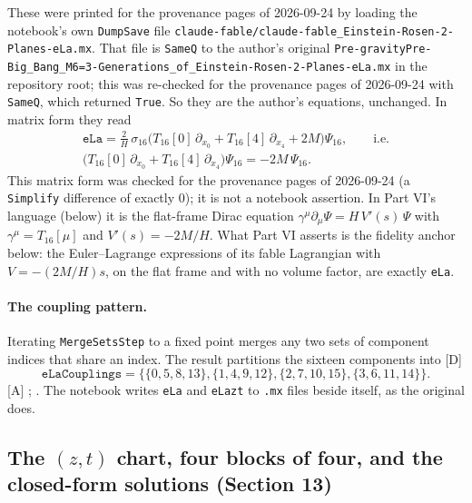 These were printed for the provenance pages of 2026-09-24 by loading the notebook's own \texttt{DumpSave} file
\texttt{claude-fable/claude-fable\_Einstein-Rosen-2-Planes-eLa.mx}. That file is \texttt{SameQ} to
the author's original
\texttt{Pre-gravityPre-Big\_Bang\_M6=3-\allowbreak Generations\_of\_\allowbreak Einstein-Rosen-2-Planes-eLa.mx} in the
repository root; this was re-checked for the provenance pages of 2026-09-24 with \texttt{SameQ}, which returned
\texttt{True}. So they are the author's equations, unchanged. In matrix form they read
\begin{gather}
  \texttt{eLa} = \frac2H\,\sigma_{16}\bigl(T_{16}[0]\,\partial_{x_0}+T_{16}[4]\,\partial_{x_4}+2M\bigr)\Psi_{16},
  \qquad\text{i.e.}\\
  \bigl(T_{16}[0]\,\partial_{x_0}+T_{16}[4]\,\partial_{x_4}\bigr)\Psi_{16} = -2M\,\Psi_{16}.
\end{gather}
This matrix form was checked for the provenance pages of 2026-09-24 (a \texttt{Simplify} difference of exactly 0); it
is not a notebook assertion. In Part VI's language (below) it is the flat-frame Dirac equation
$\gamma^\mu\partial_\mu\Psi = H\,V'(s)\,\Psi$ with $\gamma^\mu=T_{16}[\mu]$ and $V'(s)=-2M/H$. What
Part VI asserts is the fidelity anchor below: the Euler--Lagrange expressions of its fable
Lagrangian with $V=-(2M/H)s$, on the flat frame and with no volume factor, are exactly
\texttt{eLa}.

\paragraph{The coupling pattern.} Iterating \texttt{MergeSetsStep} to a fixed point merges any
two sets of component indices that share an index. The result partitions the sixteen components
into [D]
\begin{equation}
  \texttt{eLaCouplings} = \{\{0,5,8,13\},\{1,4,9,12\},\{2,7,10,15\},\{3,6,11,14\}\}.
\end{equation}
[A] ;
. The notebook writes \texttt{eLa} and \texttt{eLazt} to
\texttt{.mx} files beside itself, as the original does.

\subsection{The \texorpdfstring{$(z,t)$}{(z,t)} chart, four blocks of four, and the closed-form solutions (Section 13)}
\label{fnd:zt}\label{sec:2.9}

